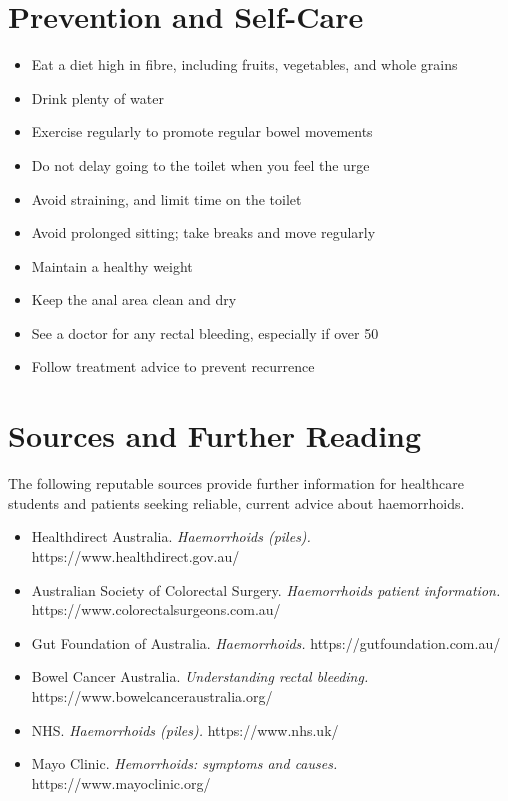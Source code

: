 \section*{Prevention and Self-Care}
\begin{itemize}
    \item Eat a diet high in fibre, including fruits, vegetables, and whole grains
    \item Drink plenty of water
    \item Exercise regularly to promote regular bowel movements
    \item Do not delay going to the toilet when you feel the urge
    \item Avoid straining, and limit time on the toilet
    \item Avoid prolonged sitting; take breaks and move regularly
    \item Maintain a healthy weight
    \item Keep the anal area clean and dry
    \item See a doctor for any rectal bleeding, especially if over 50
    \item Follow treatment advice to prevent recurrence
\end{itemize}

\section*{Sources and Further Reading}
The following reputable sources provide further information for healthcare students and patients seeking reliable, current advice about haemorrhoids.

\begin{itemize}
    \item Healthdirect Australia. \textit{Haemorrhoids (piles).} https://www.healthdirect.gov.au/
    \item Australian Society of Colorectal Surgery. \textit{Haemorrhoids patient information.} https://www.colorectalsurgeons.com.au/
    \item Gut Foundation of Australia. \textit{Haemorrhoids.} https://gutfoundation.com.au/
    \item Bowel Cancer Australia. \textit{Understanding rectal bleeding.} https://www.bowelcanceraustralia.org/
    \item NHS. \textit{Haemorrhoids (piles).} https://www.nhs.uk/
    \item Mayo Clinic. \textit{Hemorrhoids: symptoms and causes.} https://www.mayoclinic.org/
\end{itemize}
